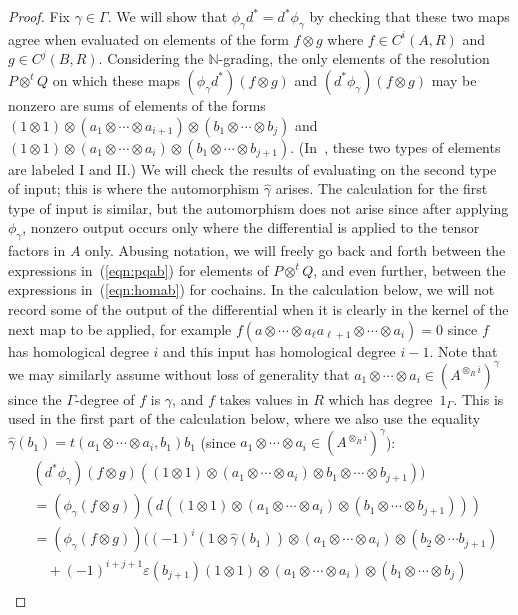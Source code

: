 \documentclass[11pt]{amsart}
\numberwithin{equation}{section}
\theoremstyle{definition}
\theoremstyle{remark}
\newcommand{\g}{\gamma}
\newcommand{\hg}{\widehat{\g}}
\newcommand{\N}{\mathbb{N}}
\newcommand\ot{\otimes}
\newcommand\ott{\otimes^{t}\!}
\begin{document}
\begin{proof}
Fix $\g\in\Gamma$. 
    We will show that $\phi_{\g} d^* = d^* \phi_{\g}$ by
    checking that these two maps agree when evaluated
    on elements of the form $f\ot g$ where $f\in C^i(A,R)$
and $g\in C^j(B,R)$. 
Considering the $\N$-grading, 
the only elements of the resolution $P\ott Q$ 
    on which these maps
$(\phi_{\g} d^*) (f\ot g)$ and $(d^* \phi_{\g} )(f\ot g)$
    may be nonzero are sums of elements of the forms
    $(1\ot 1) \ot (a_1\ot\cdots \ot a_{i+1} ) \ot (b_1\ot \cdots \ot b_{j})$
    and  $(1\ot 1) \ot (a_1\ot\cdots \ot a_{i} ) \ot (b_1\ot \cdots
    \ot b_{j+1})$.
    (In~\cite{BW}, these two types of elements are
    labeled I and II.)
    We will check the results of evaluating on the second
    type of input; this is where the automorphism $\hg$ arises.
    The calculation for the first type of input is similar,
    but the automorphism does not arise since after applying $\phi_{\g}$,
    nonzero output occurs only where
    the differential is applied
    to the tensor factors in $A$ only.
Abusing notation, we will freely go back and forth
    between the expressions in~(\ref{eqn:pqab}) for elements of $P\ott Q$,
    and even further, between the expressions in~(\ref{eqn:homab})
    for cochains.
    In the calculation below, we will not record some of the output
    of the differential when it is clearly in
    the kernel of the next map to be applied, for example
$f(a\ot\cdots \ot a_{\ell} a_{\ell +1}\ot\cdots\ot a_i) = 0$
since $f$ has homological degree $i$ and this input has homological degree $i-1$. 
    Note that we may similarly assume without loss of generality that
    $a_1\ot\cdots\ot a_i \in (A^{\ot_R i})^{\g}$ since
    the $\Gamma$-degree of $f$ is $\g$,
 and $f$ takes values in $R$ which has degree~$1_{\Gamma}$. 
This is used in the first
    part of the calculation below, where
we also use the equality $\widehat{\g} (b_1) = t( a_1\ot\cdots\ot a_i , b_1) b_1$
(since $a_1\ot\cdots\ot a_i \in (A^{\ot_R i})^{\gamma}$): 
    \[
    \begin{aligned}
     & (d^*\phi_{\g}) (f\ot g)( (1\ot 1)\ot (a_1\ot\cdots\ot a_i)\ot
      b_1\ot\cdots\ot b_{j+1}))\\ & = 
      (\phi_{\g} (f\ot g)) (d((1\ot 1) \ot  (a_1\ot\cdots\ot a_i)\ot
      (b_1\ot\cdots\ot b_{j+1}))) \\
      & =  (\phi_{\g}(f\ot g)) \big( (-1)^i (1\ot \hg ( b_1))\ot
      (a_1\ot\cdots\ot a_i)
      \ot (b_2\ot \cdots b_{j+1})\\
      & \quad + (-1)^{i+j+1} \varepsilon(b_{j+1}) (1\ot 1)
         \ot (a_1\ot \cdots \ot a_i) \ot (b_1\ot\cdots\ot b_j)\\

\end{aligned}\]
\end{proof}
\end{document}

